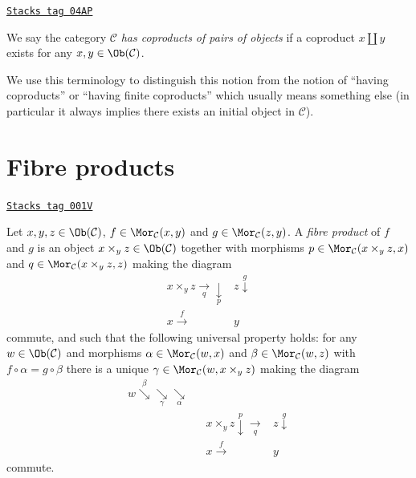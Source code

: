 \begin{definition}
\label{categories-definition-has-coproducts-of-pairs}
\href{https://stacks.math.columbia.edu/tag/04AP}{\texttt{Stacks tag 04AP}}

We say the category $\mathcal{C}$ {\it has coproducts of pairs
of objects} if a coproduct $x \amalg y$
exists for any $x, y \in \Ob(\mathcal{C})$.
\end{definition}

We use this terminology to distinguish this notion from the notion
of ``having coproducts'' or ``having finite coproducts'' which usually means
something else (in particular it always implies there exists an
initial object in $\mathcal{C}$).

\section{Fibre products}
\label{categories-section-fibre-products}
\begin{definition}
\label{categories-definition-fibre-products}
\href{https://stacks.math.columbia.edu/tag/001V}{\texttt{Stacks tag 001V}}

Let $x, y, z\in \Ob(\mathcal{C})$,
$f\in \Mor_\mathcal{C}(x, y)$
and $g\in \Mor_{\mathcal C}(z, y)$.
A {\it fibre product} of $f$ and $g$ is
an object $x \times_y z\in \Ob(\mathcal{C})$
together with morphisms
$p \in \Mor_{\mathcal C}(x \times_y z, x)$ and
$q \in \Mor_{\mathcal C}(x \times_y z, z)$ making the diagram
$$
\begin{array}{cc}x \times_y z \underset{q}{\longrightarrow}\underset{p}{\downarrow} & z \overset{g}{\downarrow} \\ x \overset{f}{\longrightarrow} & y\end{array}
$$
commute, and such that the following universal property holds: for
any $w\in \Ob(\mathcal{C})$ and morphisms
$\alpha \in \Mor_{\mathcal C}(w, x)$ and
$\beta \in \Mor_\mathcal{C}(w, z)$ with
$f \circ \alpha = g \circ \beta$
there is a unique
$\gamma \in \Mor_{\mathcal C}(w, x \times_y z)$ making
the diagram
$$
\begin{array}{cccc}w \overset{\beta}{\searrow}\underset{\gamma}{\searrow}\underset{\alpha}{\searrow} &  &  &  \\  &  & x \times_y z \overset{p}{\downarrow}\underset{q}{\longrightarrow} & z \overset{g}{\downarrow} \\  &  & x \overset{f}{\longrightarrow} & y\end{array}
$$
commute.
\end{definition}

